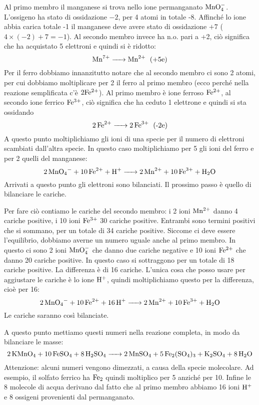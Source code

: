 Al primo membro il manganese si trova nello ione permanganato $\rm MnO_4^-$. L'ossigeno ha stato di ossidazione $-2$, per 4 atomi in totale -8. Affinché lo ione abbia carica totale -1 il manganese deve avere stato di ossidazione $+7$ ($4\times(-2) + 7 = -1$). Al secondo membro invece ha n.o. pari a +2, ciò significa che ha acquistato 5 elettroni e quindi si è ridotto:
$$\ce{Mn^7+ -> Mn^2+ \; \text{(+5e)}}$$
Per il ferro dobbiamo innanzitutto notare che al secondo membro ci sono 2 atomi, per cui dobbiamo moltiplicare per 2 il ferro al primo membro (ecco perché nella reazione semplificata c'è $\rm 2Fe^{2+}$). Al primo membro è ione ferroso $\rm Fe^{2+}$, al secondo ione ferrico $\rm Fe^{3+}$, ciò significa che ha ceduto 1 elettrone e quindi si sta ossidando
$$\ce{2Fe^2+ -> 2Fe^3+ \; \text{(-2e)}}$$
A questo punto moltiplichiamo gli ioni di una specie per il numero di elettroni scambiati dall'altra specie. In questo caso moltiplichiamo per 5 gli ioni del ferro e per 2 quelli del manganese:
$$\ce{2MnO_4- + 10Fe^2+ + H+ -> 2Mn^2+ + 10Fe^3+ + H_2O}$$
Arrivati a questo punto gli elettroni sono bilanciati. Il prossimo passo è quello di bilanciare le cariche.

Per fare ciò contiamo le cariche del secondo membro: i 2 ioni $\rm Mn^{2+}$ danno 4 cariche positive, i 10 ioni $\rm Fe^{3+}$ 30 cariche positive. Entrambi sono termini positivi che si sommano, per un totale di 34 cariche positive. Siccome ci deve essere l'equilibrio, dobbiamo averne un numero uguale anche al primo membro. In questo ci sono 2 ioni $\rm MnO_4^-$ che danno due cariche negative e 10 ioni $\rm Fe^{2+}$ che danno 20 cariche positive. In questo caso si sottraggono per un totale di 18 cariche positive. La differenza è di 16 cariche. L'unica cosa che posso usare per aggiustare le cariche è lo ione $\rm H^+$, quindi moltiplichiamo questo per la differenza, cioè per 16:
$$\ce{2MnO_4- + 10Fe^2+ + 16H+ -> 2Mn^2+ + 10Fe^3+ + H_2O}$$
Le cariche saranno così bilanciate.

A questo punto mettiamo questi numeri nella reazione completa, in modo da bilanciare le masse:
$$\ce{2KMnO_4 + 10FeSO_4 + 8H_2SO_4 -> 2MnSO_4 + 5Fe_2(SO_4)_3 + K_2SO_4 + 8H_2O}$$
Attenzione: alcuni numeri vengono dimezzati, a causa della specie molecolare. Ad esempio, il solfato ferrico ha $\rm Fe_2$ quindi moltiplico per 5 anziché per 10. Infine le 8 molecole di acqua derivano dal fatto che al primo membro abbiamo 16 ioni $\rm H^+$ e 8 ossigeni provenienti dal permanganato.

